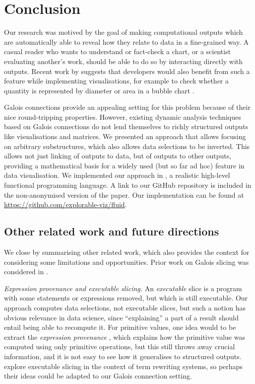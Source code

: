 \section{Conclusion}
\label{sec:conclusion}

Our research was motived by the goal of making computational outputs which are automatically able to reveal how they relate to data in a fine-grained way. A casual reader who wants to understand or fact-check a chart, or a scientist evaluating another's work, should be able to do so by interacting directly with outputs. Recent work by \citeauthor{walny19} suggests that developers would also benefit from such a feature while implementing visualisations, for example to check whether a quantity is represented by diameter or area in a bubble chart \cite{walny19}.

Galois connections provide an appealing setting for this problem because of their nice round-tripping properties. However,  existing dynamic analysis techniques based on Galois connections do not lend themselves to richly structured outputs like visualisations and matrices. We presented an approach that allows focusing on arbitrary substructures, which also allows data selections to be inverted. This allows not just linking of outputs to data, but of outputs to other outputs, providing a mathematical basis for a widely used (but so far ad hoc) feature in data visualisation. We implemented our approach in \OurLanguage, a realistic high-level functional programming language. %
\ifanonymous%
   A link to our GitHub repository is included in the non-anonymised version of the paper.
\else%
   Our implementation can be found at \url{https://github.com/explorable-viz/fluid}.%
\fi%

\subsection{Other related work and future directions}
\label{sec:conclusion:other-related-work}

We close by summarising other related work, which also provides the context for considering some limitations and opportunities. Prior work on Galois slicing \cite{perera12a,ricciotti17,perera16d} was considered in .

\emph{Expression provenance and executable slicing.} An \emph{executable} slice is a program with some statements or expressions removed, but which is still executable. Our approach computes data selections, not executable slices, but such a notion has obvious relevance in data science, since ``explaining'' a part of a result should entail being able to recompute it. For primitive values, one idea would to be extract the \emph{expression provenance} \cite{acar12}, which explains how the primitive value was computed using only primitive operations, but this still throws away crucial information, and it is not easy to see how it generalises to structured outputs. \citet{field98} explore executable slicing in the context of term rewriting systems, so perhaps their ideas could be adapted to our Galois connection setting.

